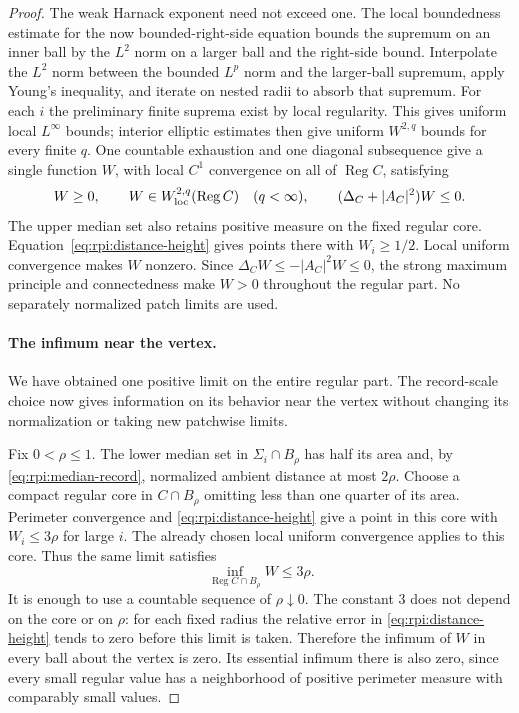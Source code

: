 \begin{proof}
The weak Harnack exponent need not exceed one. The local boundedness
estimate for the now bounded-right-side equation bounds the supremum
on an inner ball by the $L^2$ norm on a larger ball and the right-side
bound. Interpolate the $L^2$ norm between the bounded $L^p$ norm
and the larger-ball supremum, apply Young's inequality, and iterate
on nested radii to absorb that supremum. For each $i$ the preliminary
finite suprema exist by local regularity. This gives uniform local
$L^\infty$ bounds; interior elliptic estimates then give uniform
$W^{2,q}$ bounds for every finite $q$. One countable exhaustion and
one diagonal subsequence give a single function $W$, with local
$C^1$ convergence on all of $\operatorname{Reg}C$, satisfying
\begin{equation}\label{eq:rpi:median-limit}
 W\ge0,
 \qquad W\in W^{2,q}_{\rm loc}(\operatorname{Reg}C)
          \quad(q<\infty),
 \qquad (\Delta_C+|A_C|^2)W\le0.
\end{equation}
The upper median set also retains positive measure on the fixed
regular core. Equation~\eqref{eq:rpi:distance-height} gives points
there with $W_i\ge1/2$. Local uniform convergence makes $W$
nonzero. Since $\Delta_CW\le-|A_C|^2W\le0$, the strong maximum
principle and connectedness make $W>0$ throughout the regular part.
No separately normalized patch limits are used.

\paragraph{The infimum near the vertex.}
We have obtained one positive limit on the entire regular part. The
record-scale choice now gives information on its behavior near the
vertex without changing its normalization or taking new patchwise
limits.

Fix $0<\rho\le1$. The lower median set in $\Sigma_i\cap B_\rho$
has half its area and, by \eqref{eq:rpi:median-record}, normalized
ambient distance at most $2\rho$. Choose a compact regular core
in $C\cap B_\rho$ omitting less than one quarter of its area.
Perimeter convergence and \eqref{eq:rpi:distance-height} give a
point in this core with $W_i\le3\rho$ for large $i$. The already
chosen local uniform convergence applies to this core. Thus the
same limit satisfies
\begin{equation}\label{eq:rpi:median-small-infimum}
 \inf_{\operatorname{Reg}C\cap B_\rho}W\le3\rho.
\end{equation}
It is enough to use a countable sequence of $\rho\downarrow0$.
The constant $3$ does not depend on the core or on $\rho$: for
each fixed radius the relative error in
\eqref{eq:rpi:distance-height} tends to zero before this limit is
taken. Therefore the infimum of $W$ in every ball about the vertex
is zero. Its essential infimum there is also zero, since every
small regular value has a neighborhood of positive perimeter measure
with comparably small values.


\end{proof}
